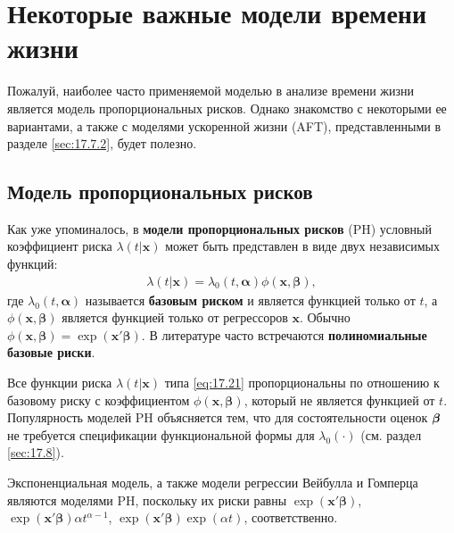 \section{Некоторые важные модели времени жизни}\label{sec:17.7}

\noindent
Пожалуй, наиболее часто применяемой моделью в анализе времени жизни является модель пропорциональных рисков. Однако знакомство с некоторыми ее вариантами, %
а также с моделями ускоренной жизни (AFT), представленными в разделе \ref{sec:17.7.2}, будет полезно.


\subsection{Модель пропорциональных рисков}\label{sec:17.7.1}

\noindent
Как уже упоминалось, в \textbf{модели пропорциональных рисков} (PH) условный коэффициент риска $\lambda(t|\mathbf{x})$ может быть представлен в виде двух независимых функций:
        \begin{align}
        \label{eq:17.21}
        \lambda(t|\mathbf{x})=\lambda_0(t,\mathbf{\bm{\alpha}})\phi(\mathbf{x},\bm{\beta}),
        \end{align}
где $\lambda_0(t,\bm{\alpha})$ называется \textbf{базовым риском} и является функцией только от $t$, а $\phi(\mathbf{x},\bm{\beta})$ является функцией только от регрессоров $\mathbf{x}$. Обычно $\phi(\mathbf{x},\bm{\beta})=\exp(\mathbf{x}'\bm{\beta})$. В литературе часто встречаются \textbf{полиномиальные базовые риски}.

Все функции риска $\lambda(t|\mathbf{x})$ типа \ref{eq:17.21} пропорциональны по отношению к базовому риску с коэффициентом $\phi(\mathbf{x},\bm{\beta})$, который не является функцией от $t$. Популярность моделей PH объясняется тем, что для состоятельности оценок $\bm{\beta}$ не требуется спецификации функциональной формы для $\lambda_0(\cdot)$ (см. раздел \ref{sec:17.8}).

Экспоненциальная модель, а также модели регрессии Вейбулла и Гомперца являются моделями PH, поскольку их риски равны $\exp(\mathbf{x}'\bm{\beta})$, $\exp(\mathbf{x}'\bm{\beta})\alpha t^{\alpha-1}$, $\exp(\mathbf{x}'\bm{\beta})\exp(\alpha t)$, соответственно.

